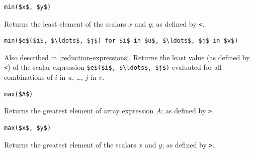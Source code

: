 \begin{operatordefinition*}[min]\label{modelica:min-binary}
\begin{synopsis}\begin{lstlisting}
min($x$, $y$)
\end{lstlisting}\end{synopsis}
\begin{semantics}
Returns the least element of the scalars $x$ and $y$; as defined by \lstinline!<!.
\end{semantics}
\end{operatordefinition*}

\begin{operatordefinition*}[min]\label{modelica:min-reduction}
\begin{synopsis}\begin{lstlisting}
min($e$($i$, $\ldots$, $j$) for $i$ in $u$, $\ldots$, $j$ in $v$)
\end{lstlisting}\end{synopsis}
\begin{semantics}
Also described in \cref{reduction-expressions}.
Returns the least value (as defined by \lstinline!<!) of the scalar expression \lstinline!$e$($i$, $\ldots$, $j$)! evaluated for all combinations of $i$ in $u$, \ldots, $j$ in $v$.
\end{semantics}
\end{operatordefinition*}

\begin{operatordefinition*}[max]\label{modelica:max-of-array}
\begin{synopsis}\begin{lstlisting}
max($A$)
\end{lstlisting}\end{synopsis}
\begin{semantics}
Returns the greatest element of array expression $A$; as defined by \lstinline!>!.
\end{semantics}
\end{operatordefinition*}

\begin{operatordefinition*}[max]\label{modelica:max-binary}
\begin{synopsis}\begin{lstlisting}
max($x$, $y$)
\end{lstlisting}\end{synopsis}
\begin{semantics}
Returns the greatest element of the scalars $x$ and $y$; as defined by \lstinline!>!.
\end{semantics}
\end{operatordefinition*}

